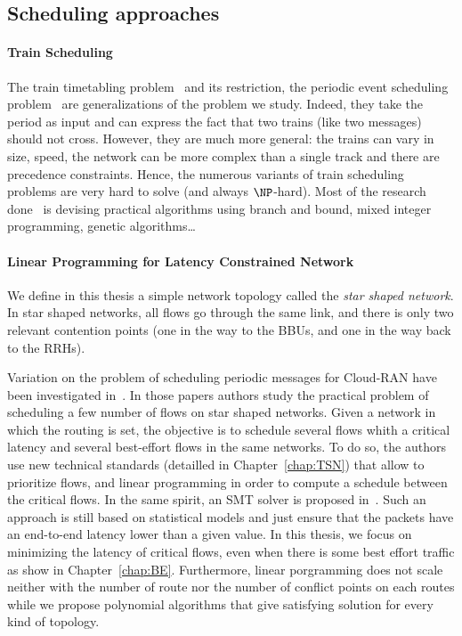 \subsection{Scheduling approaches}


\paragraph{Train Scheduling}

The train timetabling problem~\cite{lusby2011railway} and its restriction, the periodic event scheduling problem~\cite{serafini1989mathematical} are generalizations of the problem we study. Indeed, they take the period as input and can express the fact that two trains (like two messages) should not cross. However, they are much more general: the trains can vary in size, speed, the network can be more complex than a single track and there are precedence constraints. Hence, the numerous variants of train scheduling problems are very hard to solve (and always $\NP$-hard). Most of the research done~\cite{lusby2011railway} is devising practical algorithms using branch and bound, mixed integer programming, genetic algorithms\dots

\paragraph{Linear Programming for Latency Constrained Network}
We define in this thesis a simple network topology called the {\em star shaped network}. In star shaped networks, all flows go through the same link, and there is only two relevant contention points (one in the way to the BBUs, and one in the way back to the RRHs).

Variation on the problem of scheduling periodic messages for Cloud-RAN have been investigated in~\cite{nayak2017incremental,steiner2018traffic,silviu2017,naresh2016}. In those papers authors study the practical problem of scheduling a few number of flows on star shaped networks. Given a network in which the routing is set, the objective is to schedule several flows whith a critical latency and several best-effort flows in the same networks. To do so, the authors use new technical standards (detailled in Chapter~\ref{chap:TSN}) that allow to prioritize flows, and linear programming in order to compute a schedule between the critical flows. In the same spirit, an SMT solver is proposed in~\cite{dos2019tsnsched}. Such an approach is still based on statistical models and just ensure that the packets have an end-to-end latency lower than a given value. In this thesis, we focus on minimizing the latency of critical flows, even when there is some best effort traffic as show in Chapter~\ref{chap:BE}. Furthermore, linear porgramming does not scale neither with the number of route nor the number of conflict points on each routes while we propose polynomial algorithms that give satisfying solution for every kind of topology.


